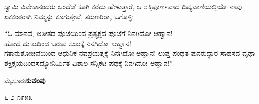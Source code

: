 ಸ್ವಾಮಿ ವಿವೇಕಾನಂದರು ಒಂದೆಡೆ ಕೂಗಿ ಕರೆದು ಹೇಳುತ್ತಾರೆ, ಆ ಶಕ್ತಿಪೂರ್ಣವಾದ ದಿವ್ಯವಾಣಿಯಲ್ಲಿಯೇ ನಾವು ಏಕಕಂಠರಾಗಿ ನಿಮ್ಮನ್ನು ಕೂಗುತ್ತೇವೆ, ತರುಣರಿರಾ, ಓಗೊಳ್ಳಿ:

“ಓ ಮಾನವ, ಅತೀತದ ಪೂಜೆಯಿಂದ ಪ್ರತ್ಯಕ್ಷದ ಪೂಜೆಗೆ ನಿನಗಿದೋ ಆಹ್ವಾನ!\\ಹೋದ ದುಃಖದಿಂದ ಬರುವ ಸುಖಕ್ಕೆ ನಿನಗಿದೋ ಆಹ್ವಾನ!\\ಗತಾನುಶೋಚನೆಯಿಂದ ಆಧುನಿಕ ನವಪ್ರಯತ್ನಕ್ಕೆ ನಿನಗಿದೋ ಆಹ್ವಾನ! ಲುಪ್ತ ಪಂಥತ ಪುನರುದ್ಧಾರ ಸಾಹಸದ ವೃಥಾ ಶಕ್ತಿಕ್ಷಯದಿಂದಸದ್ಯೋನಿರ್ಮಿತ ವಿಶಾಲ ಸನ್ನಿಕಟ ಪಥಕ್ಕೆ ನಿನಗಿದೋ ಆಹ್ವಾನ!”

\bigskip

\noindent
ಮೈಸೂರು\hfill \textbf{ಕುವೆಂಪು}

\noindent
೬-೨-೧೯೫೩

